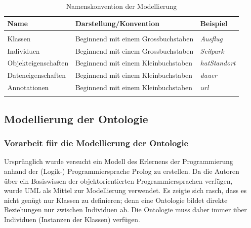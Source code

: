 \begin{table}[H]%
    \centering
    \begin{tabular}{l l l}
        \toprule{}
        \textbf{Name}       & \textbf{Darstellung/Konvention}       & \textbf{Beispiel}\\
        \midrule{}\\
        Klassen             & Beginnend mit einem Grossbuchstaben   & \textit{Ausflug}\\
        Individuen          & Beginnend mit einem Grossbuchstaben   & \textit{Seilpark}\\
        Objekteigenschaften & Beginnend mit einem Kleinbuchstaben   & \textit{hatStandort}\\
        Dateneigenschaften  & Beginnend mit einem Kleinbuchstaben   & \textit{dauer}\\
        Annotationen        & Beginnend mit einem Kleinbuchstaben   & \textit{url}\\
        \bottomrule{}
    \end{tabular}
    \caption{Namenskonvention der Modellierung}
\label{tab:vorgehen:grndlagen:technisch:konvention}
\end{table}%


\subsection{Modellierung der Ontologie}
\label{sub:modellierung_der_ontologie}

\subsubsection{Vorarbeit für die Modellierung der Ontologie}
\label{sub:modellierung_der_ontologie_vorarbeit}
Ursprünglich wurde versucht ein Modell des Erlernens der Programmierung anhand der (Logik-) Programmiersprache Prolog zu erstellen. Da die Autoren über ein Basiswissen der objektorientierten Programmiersprachen verfügen, wurde UML als Mittel zur Modellierung verwendet. Es zeigte sich rasch, dass es nicht genügt nur Klassen zu definieren; denn eine Ontologie bildet direkte Beziehungen nur zwischen Individuen ab. Die Ontologie muss daher immer über Individuen (Instanzen der Klassen) verfügen.

